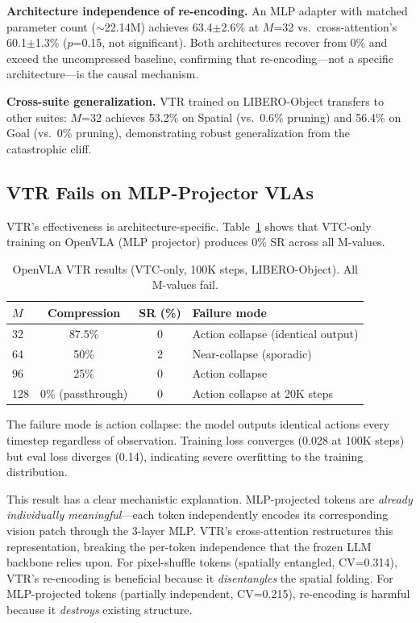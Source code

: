\documentclass[letterpaper]{article}
\begin{document}
\textbf{Architecture independence of re-encoding.}
An MLP adapter with matched parameter count ($\sim$22.14M) achieves 63.4$\pm$2.6\% at $M$=32 vs.\ cross-attention's 60.1$\pm$1.3\% ($p$=0.15, not significant).
Both architectures recover from 0\% and exceed the uncompressed baseline, confirming that re-encoding---not a specific architecture---is the causal mechanism.

\textbf{Cross-suite generalization.}
VTR trained on LIBERO-Object transfers to other suites: $M$=32 achieves 53.2\% on Spatial (vs.\ 0.6\% pruning) and 56.4\% on Goal (vs.\ 0\% pruning), demonstrating robust generalization from the catastrophic cliff.

\subsection{VTR Fails on MLP-Projector VLAs}
\label{sec:vtr_mlp}

VTR's effectiveness is architecture-specific.
Table~\ref{tab:vtr_openvla} shows that VTC-only training on OpenVLA (MLP projector) produces 0\% SR across all M-values.

\begin{table}[h]
\centering
\caption{OpenVLA VTR results (VTC-only, 100K steps, LIBERO-Object). All M-values fail.}
\label{tab:vtr_openvla}
\begin{tabular}{lccl}
\toprule
\textbf{$M$} & \textbf{Compression} & \textbf{SR (\%)} & \textbf{Failure mode} \\
\midrule
32 & 87.5\% & 0 & Action collapse (identical output) \\
64 & 50\% & 2 & Near-collapse (sporadic) \\
96 & 25\% & 0 & Action collapse \\
128 & 0\% (passthrough) & 0 & Action collapse at 20K steps \\
\bottomrule
\end{tabular}
\end{table}

The failure mode is action collapse: the model outputs identical actions every timestep regardless of observation.
Training loss converges (0.028 at 100K steps) but eval loss diverges (0.14), indicating severe overfitting to the training distribution.

This result has a clear mechanistic explanation.
MLP-projected tokens are \emph{already individually meaningful}---each token independently encodes its corresponding vision patch through the 3-layer MLP.
VTR's cross-attention restructures this representation, breaking the per-token independence that the frozen LLM backbone relies upon.
For pixel-shuffle tokens (spatially entangled, CV=0.314), VTR's re-encoding is beneficial because it \emph{disentangles} the spatial folding.
For MLP-projected tokens (partially independent, CV=0.215), re-encoding is harmful because it \emph{destroys} existing structure.
\end{document}
